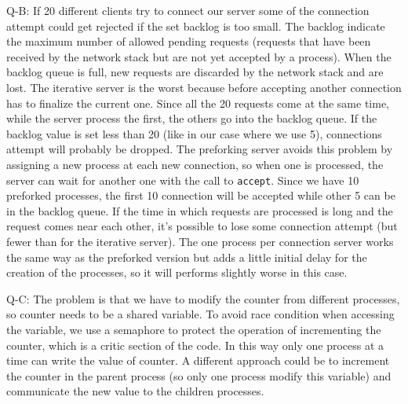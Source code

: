 Q-B: If 20 different clients try to connect our server some of the connection attempt could get rejected if the set backlog is too small. The backlog indicate the maximum number of allowed pending requests (requests that have been received by the network stack but are not yet accepted by a process). When the backlog queue is full, new requests are discarded by the network stack and are lost. The iterative server is the worst because before accepting another connection has to finalize the current one. Since all the 20 requests come at the same time, while the server process the first, the others go into the backlog queue. If the backlog value is set less than 20 (like in our case where we use 5), connections attempt will probably be dropped. The preforking server avoids this problem by assigning a new process at each new connection, so when one is processed, the server can wait for another one with the call to \texttt{accept}. Since we have 10 preforked processes, the first 10 connection will be accepted while other 5 can be in the backlog queue. If the time in which requests are processed is long and the request comes near each other, it's possible to lose some connection attempt (but fewer than for the iterative server). The one process per connection server works the same way as the preforked version but adds a little initial delay for the creation of the processes, so it will performs slightly worse in this case. \newline

Q-C: The problem is that we have to modify the counter from different processes, so counter needs to be a shared variable. To avoid race condition when accessing the variable, we use a semaphore to protect the operation of incrementing the counter, which is a critic section of the code. In this way only one process at a time can write the value of counter. A different approach could be to increment the counter in the parent process (so only one process modify this variable) and communicate the new value to the children processes.\newline

